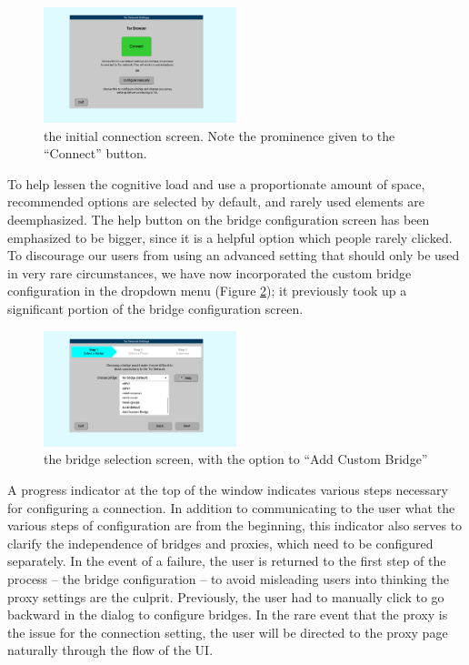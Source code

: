 \documentclass{template}
\begin{document}
\begin{figure}[t]
\label{fig:redesign-firstscreen}
  \centering
    \includegraphics[width=0.5\textwidth]{redesign-firstscreen.png}
    \caption{the initial connection screen. Note the prominence given to the
    ``Connect'' button.}
\end{figure}

To help lessen the cognitive load and use a proportionate amount of space,
recommended options are selected by default, and rarely used
elements are deemphasized.
The help button on the bridge configuration screen
has been emphasized to be bigger, since it is a helpful option which people rarely
clicked. To discourage our users from using an advanced setting
that should only be used in very rare circumstances,
we have now incorporated the custom bridge configuration in the dropdown menu
(Figure \ref{fig:redesign-bridges});
it previously took up a significant portion of the bridge configuration screen. 

\begin{figure}[t]
\label{fig:redesign-bridges}
  \centering
    \includegraphics[width=0.5\textwidth]{redesign-bridges.png}
    \caption{the bridge selection screen, with the option to ``Add Custom
    Bridge''}
\label{fig:redesign-bridges}
\end{figure}

A progress indicator at the top of the window indicates various steps necessary
for configuring a connection. In addition to communicating to the user what the various 
steps of configuration are from the beginning, this indicator also serves to clarify the independence of
bridges and proxies, which need to be configured separately. In the event of a failure, the user is
returned to the first step of the process -- the bridge configuration -- to
avoid misleading users into thinking the proxy settings are the culprit. Previously,
the user had to manually click to go backward in the dialog to configure bridges.
In the rare event that the proxy is the issue for the connection setting, the user
will be directed to the proxy page naturally through the flow of the UI. \\
\end{document}
